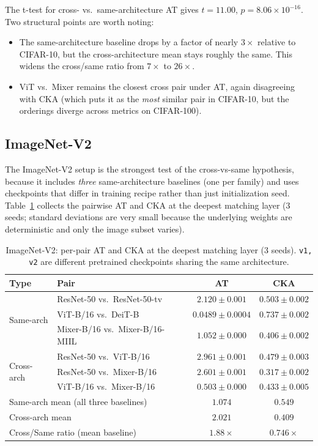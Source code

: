 \documentclass[11pt]{article}
\begin{document}
The t-test for cross- vs.\ same-architecture AT gives
$t = 11.00$, $p = 8.06 \times 10^{-16}$. Two structural points are
worth noting:
\begin{itemize}
\item The same-architecture baseline drops by a factor of nearly $3\times$
relative to CIFAR-10, but the cross-architecture mean stays
roughly the same. This widens the cross/same ratio from
$7\times$ to $26\times$.
\item ViT vs.\ Mixer remains the closest cross pair under AT, again
disagreeing with CKA (which puts it as the \emph{most} similar pair
in CIFAR-10, but the orderings diverge across metrics on CIFAR-100).
\end{itemize}

\subsection{ImageNet-V2}

The ImageNet-V2 setup is the strongest test of the cross-vs-same
hypothesis, because it includes \emph{three} same-architecture
baselines (one per family) and uses checkpoints that differ in
training recipe rather than just initialization seed.
Table~\ref{tab:imagenet-pairs} collects the pairwise AT and CKA at
the deepest matching layer (3 seeds; standard deviations are very
small because the underlying weights are deterministic and only the
image subset varies).

\begin{table}[t]
\centering
\caption{ImageNet-V2: per-pair AT and CKA at the deepest matching layer
(3 seeds). \texttt{v1, v2} are different pretrained checkpoints sharing
the same architecture.}
\label{tab:imagenet-pairs}
\begin{tabular}{llcc}
\toprule
Type & Pair & AT & CKA \\
\midrule
\multirow{3}{*}{Same-arch} & ResNet-50 vs.\ ResNet-50-tv & $2.120 \pm 0.001$ & $0.503 \pm 0.002$ \\
& ViT-B/16 vs.\ DeiT-B & $\mathbf{0.0489 \pm 0.0004}$ & $0.737 \pm 0.002$ \\
& Mixer-B/16 vs.\ Mixer-B/16-MIIL & $1.052 \pm 0.000$ & $0.406 \pm 0.002$ \\
\midrule
\multirow{3}{*}{Cross-arch} & ResNet-50 vs.\ ViT-B/16 & $2.961 \pm 0.001$ & $0.479 \pm 0.003$ \\
& ResNet-50 vs.\ Mixer-B/16 & $2.601 \pm 0.001$ & $0.317 \pm 0.002$ \\
& ViT-B/16 vs.\ Mixer-B/16 & $0.503 \pm 0.000$ & $0.433 \pm 0.005$ \\
\midrule
\multicolumn{2}{l}{Same-arch mean (all three baselines)} & $1.074$ & $0.549$ \\
\multicolumn{2}{l}{Cross-arch mean} & $2.021$ & $0.409$ \\
\multicolumn{2}{l}{Cross/Same ratio (mean baseline)} & $1.88\times$ & $0.746\times$ \\
\bottomrule
\end{tabular}
\end{table}
\end{document}
